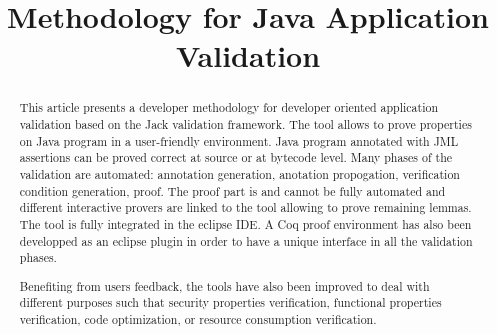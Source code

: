 \documentclass[10pt]{article}
\title{Methodology for Java Application Validation}
\author{}
\begin{document}
\maketitle      
\begin{abstract}
This article presents a developer
methodology for developer oriented application validation based on 
the Jack validation framework. The tool allows to prove properties on
Java program in a user-friendly environment. Java program annotated
with JML assertions can be proved correct at source or at bytecode
level. Many phases of the validation are automated: annotation
generation, anotation propogation, verification condition generation,
proof. The proof part is and cannot be fully automated and different
interactive provers are linked to the tool allowing to prove remaining
lemmas. The tool is fully integrated in the eclipse IDE. A Coq proof
environment has also been developped as an eclipse plugin in order to
have a unique interface in all the validation phases.

Benefiting from users feedback, the tools have also been improved
to deal with different purposes such that security properties
verification, functional properties verification, code optimization,
or resource consumption verification.
\end{abstract}
        
        





\end{document}
